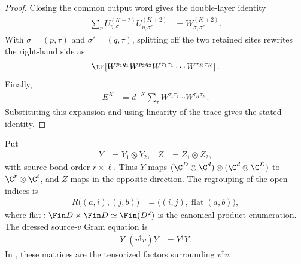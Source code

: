 \begin{proof}\leanok
    Closing the common output word gives the double-layer identity
    \begin{align}
        \sum_\eta
        \overline{U^{(K+2)}_{\eta,\sigma}}
        U^{(K+2)}_{\eta,\sigma'}
         & =W^{(K+2)}_{\sigma,\sigma'}.
    \end{align}
    With $\sigma=(p,\tau)$ and $\sigma'=(q,\tau)$, splitting off the two
    retained sites rewrites the right-hand side as
    \begin{align}
        \tr\!\left[
            W^{p_1q_1}W^{p_2q_2}
            W^{\tau_1\tau_1}\cdots W^{\tau_K\tau_K}\right].
    \end{align}
    Finally,
    \begin{align}
        E^K
         & =d^{-K}\sum_\tau
        W^{\tau_1\tau_1}\cdots W^{\tau_K\tau_K}.
    \end{align}
    Substituting this expansion and using linearity of the trace gives the stated identity.
\end{proof}

\begin{definition}
    \label{def:mpu_source_v_dressing}
    \leanok
    Put
    \begin{align}
        Y & =Y_1\otimes Y_2,
          & Z                & =Z_1\otimes Z_2,
    \end{align}
    with source-bond order $r\times\ell$. Thus $Y$ maps
    $(\C^D\otimes\C^d)\otimes(\C^d\otimes\C^D)$ to
    $\C^r\otimes\C^\ell$, and $Z$ maps in the opposite direction. The
    regrouping of the open indices is
    \begin{align}
        R\bigl((a,i),(j,b)\bigr)
         & =\bigl((i,j),\operatorname{flat}(a,b)\bigr),
    \end{align}
    where $\operatorname{flat}:\Fin D\times\Fin D\simeq\Fin(D^2)$ is the
    canonical product enumeration. The dressed source-$v$ Gram equation is
    \begin{align}
        Y^\dagger(v^\dagger v)Y & =Y^\dagger Y.
    \end{align}
    In \cite[Theorem~III.8, Section~III.B, equations~(31)--(32)]{Cirac2017MPU}, these matrices are the tensorized factors surrounding
    $v^\dagger v$.
\end{definition}

